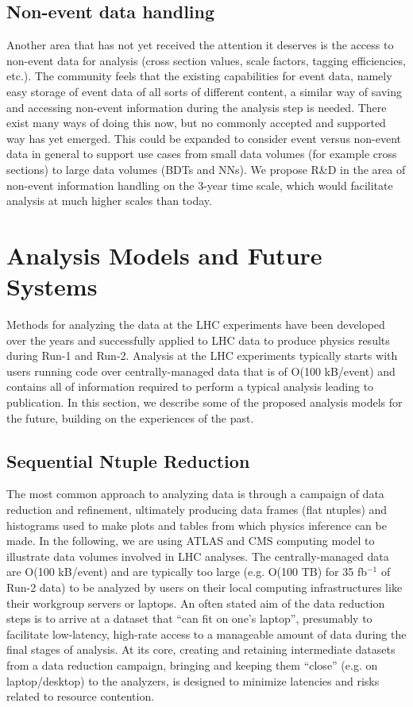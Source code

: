 \documentclass[12pt,a4paper]{article}
\begin{document}
\subsection{Non-event data handling} 
Another area that has not yet received the attention it deserves is the access to non-event data for analysis (cross section values, scale factors, tagging efficiencies, etc.). The community feels that the existing capabilities for event data, namely easy storage of event data of all sorts of different content, a similar way of saving and accessing non-event information during the analysis step is needed. There exist many ways of doing this now, but no commonly accepted and supported way has yet emerged. This could be expanded to consider event versus non-event data in general to support use cases from small data volumes (for example cross sections) to large data volumes (BDTs and NNs). We propose R\&D in the area of non-event information handling on the 3-year time scale, which would facilitate analysis at much higher scales than today.

\section{Analysis Models and Future Systems}\label{sec:models}

Methods for analyzing the data at the LHC experiments have been developed over the years and successfully applied to LHC data to produce physics results during Run-1 and Run-2. Analysis at the LHC experiments typically starts with users running code over centrally-managed data that is of O(100 kB/event) and contains all of information required to perform a typical analysis leading to publication. In this section, we describe some of the proposed analysis models for the future, building on the experiences of the past.

\subsection{Sequential Ntuple Reduction}

The most common approach to analyzing data is through a campaign of data reduction and refinement, ultimately producing data frames (flat ntuples) and histograms used to make plots and tables from which physics inference can be made. In the following, we are using ATLAS and CMS computing model to illustrate data volumes involved in LHC analyses. The centrally-managed data are O(100 kB/event) and are typically too large (e.g. O(100 TB) for 35 fb$^{-1}$ of Run-2 data) to be analyzed by users on their local computing infrastructures like their workgroup servers or laptops. An often stated aim of the data reduction steps is to arrive at a dataset that ``can fit on one's laptop'', presumably to facilitate low-latency, high-rate access to a manageable amount of data during the final stages of analysis.  At its core, creating and retaining intermediate datasets from a data reduction campaign, bringing and keeping them ``close'' (e.g. on laptop/desktop) to the analyzers, is designed to minimize latencies and risks related to resource contention.
\end{document}
